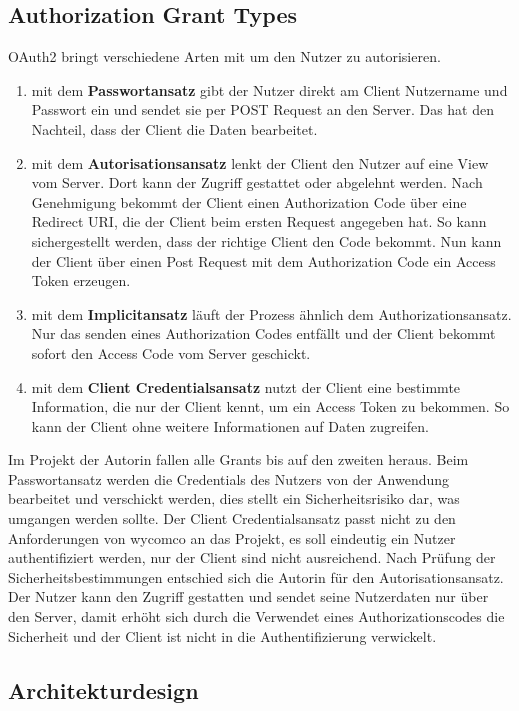 \subsection{Authorization Grant Types}
\label{sec:AuthorizationGrants}

OAuth2 bringt verschiedene Arten mit um den Nutzer zu autorisieren.

\begin{enumerate}
\item mit dem \textbf{Passwortansatz} gibt der Nutzer direkt am Client Nutzername und Passwort ein und sendet sie per POST Request an den Server. Das hat den Nachteil, dass der Client die Daten bearbeitet.
\item mit dem \textbf{Autorisationsansatz} lenkt der Client den Nutzer auf eine View vom Server. Dort kann der Zugriff gestattet oder abgelehnt werden. Nach Genehmigung bekommt der Client einen Authorization Code über eine Redirect URI, die der Client beim ersten Request angegeben hat. So kann sichergestellt werden, dass der richtige Client den Code bekommt. Nun kann der Client über einen Post Request mit dem Authorization Code ein Access Token erzeugen. 
\item mit dem \textbf{Implicitansatz} läuft der Prozess ähnlich dem Authorizationsansatz. Nur das senden eines Authorization Codes entfällt und der Client bekommt sofort den Access Code vom Server geschickt.
\item mit dem \textbf{Client Credentialsansatz} nutzt der Client eine bestimmte Information, die nur der Client kennt, um ein Access Token zu bekommen. So kann der Client ohne weitere Informationen auf Daten zugreifen.
\end{enumerate}

Im Projekt der Autorin fallen alle Grants bis auf den zweiten heraus. Beim Passwortansatz werden die Credentials des Nutzers von der Anwendung bearbeitet und verschickt werden, dies stellt ein Sicherheitsrisiko dar, was umgangen werden sollte.
Der Client Credentialsansatz passt nicht zu den Anforderungen von wycomco an das Projekt, es soll eindeutig ein Nutzer authentifiziert werden, nur der Client sind nicht ausreichend. Nach Prüfung der Sicherheitsbestimmungen entschied sich die Autorin für den Autorisationsansatz. Der Nutzer kann den Zugriff gestatten und sendet seine Nutzerdaten nur über den Server, damit erhöht sich durch die Verwendet eines Authorizationscodes die Sicherheit und der Client ist nicht in die Authentifizierung verwickelt.

\subsection{Architekturdesign}
\label{sec:Architekturdesign}


